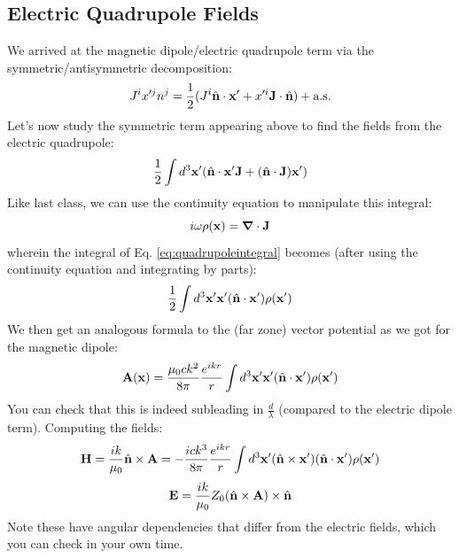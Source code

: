 \subsection{Electric Quadrupole Fields}
We arrived at the magnetic dipole/electric quadrupole term via the symmetric/antisymmetric decomposition:
\begin{equation}
    J^ix'^jn^j = \frac{1}{2}(J^i\hat{\mathbf{n}}\cdot\mathbf{x}' + x'^i\mathbf{J} \cdot \hat{\mathbf{n}}) + \text{a.s.}
\end{equation}
Let's now study the symmetric term appearing above to find the fields from the electric quadrupole:
\begin{equation}\label{eq:quadrupoleintegral}
    \frac{1}{2}\int d^3\mathbf{x}'(\hat{\mathbf{n}}\cdot\mathbf{x}' \mathbf{J} + (\hat{\mathbf{n}}\cdot\mathbf{J})\mathbf{x}')
\end{equation}
Like last class, we can use the continuity equation to manipulate this integral:
\begin{equation}
    i\omega\rho(\v{x}) = \nabla \cdot \v{J}
\end{equation}
wherein the integral of Eq. \eqref{eq:quadrupoleintegral} becomes (after using the continuity equation and integrating by parts):
\begin{equation}
    \frac{1}{2}\int d^3\mathbf{x}'\mathbf{x}'(\hat{\mathbf{n}}\cdot\mathbf{x}')\rho(\mathbf{x}')
\end{equation}
We then get an analogous formula to the (far zone) vector potential as we got for the magnetic dipole:
\begin{equation}
    \mathbf{A}(\mathbf{x}) = \frac{\mu_0 ck^2}{8\pi}\frac{e^{ikr}}{r}\int d^3\mathbf{x}'\mathbf{x}'(\hat{\mathbf{n}}\cdot\mathbf{x}')\rho(\mathbf{x}')
\end{equation}
You can check that this is indeed subleading in $\frac{d}{\lambda}$ (compared to the electric dipole term). Computing the fields:
\begin{equation}
    \mathbf{H} = \frac{ik}{\mu_0}\hat{\mathbf{n}}\times\mathbf{A} = -\frac{ick^3}{8\pi}\frac{e^{ikr}}{r}\int d^3\mathbf{x}'(\hat{\mathbf{n}}\times\mathbf{x}')(\hat{\mathbf{n}}\cdot \mathbf{x}')\rho(\mathbf{x}')
\end{equation}
\begin{equation}\label{eq:quadrapoleE}
    \mathbf{E} = \frac{ik}{\mu_0}Z_0(\hat{\mathbf{n}}\times\mathbf{A})\times\hat{\mathbf{n}}
\end{equation}
Note these have angular dependencies that differ from the electric fields, which you can check in your own time.

